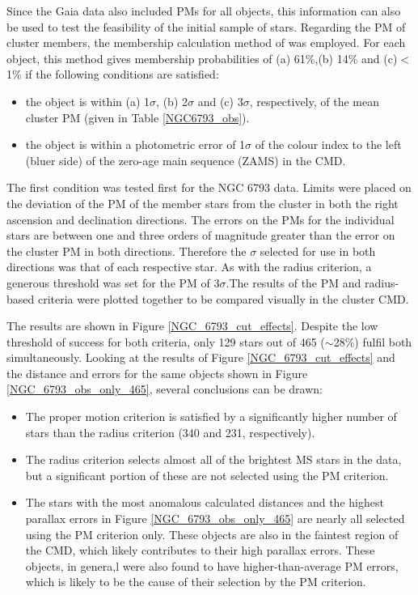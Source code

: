 \documentclass[12pt, a4paper]{report}
\begin{document}
Since the Gaia data also included PMs for all objects, this information can also be used to test the feasibility of the initial sample of stars. Regarding the PM of cluster members, the membership calculation method of \cite{2003ARep...47..263K} was employed. For each object, this method gives membership probabilities of (a) 61\%,(b) 14\% and (c)$<$1\% \cite{2006A&A...446..949D} if the following conditions are satisfied:

\begin{itemize}
\item the object is within (a) 1$\sigma$, (b) 2$\sigma$ and (c) 3$\sigma$, respectively, of the mean cluster PM (given in Table \ref{NGC6793_obs}).
\item the object is within a photometric error of 1$\sigma$ of the colour index to the left (bluer side) of the zero-age main sequence (ZAMS) in the CMD.
\end{itemize}

The first condition was tested first for the NGC 6793 data. Limits were placed on the deviation of the PM of the member stars from the cluster in both the right ascension and declination directions. The errors on the PMs for the individual stars are between one and three orders of magnitude greater than the error on the cluster PM in both directions. Therefore the $\sigma$ selected for use in both directions was that of each respective star. As with the radius criterion, a generous threshold was set for the PM of 3$\sigma$.The results of the PM and radius-based criteria were plotted together to be compared visually in the cluster CMD.

The results are shown in Figure \ref{NGC_6793_cut_effects}. Despite the low threshold of success for both criteria, only 129 stars out of 465 ($\sim$28\%) fulfil both simultaneously. Looking at the results of Figure \ref{NGC_6793_cut_effects} and the distance and errors for the same objects shown in Figure \ref{NGC_6793_obs_only_465}, several conclusions can be drawn:

\begin{itemize}
\item The proper motion criterion is satisfied by a significantly higher number of stars than the radius criterion (340 and 231, respectively).
\item The radius criterion selects almost all of the brightest MS stars in the data, but a significant portion of these are not selected using the PM criterion.
\item The stars with the most anomalous calculated distances and the highest parallax errors in Figure \ref{NGC_6793_obs_only_465} are nearly all selected using the PM criterion only. These objects are also in the faintest region of the CMD, which likely contributes to their high parallax errors. These objects, in genera,l were also found to have higher-than-average PM errors, which is likely to be the cause of their selection by the PM criterion.
\end{itemize}
\end{document}
